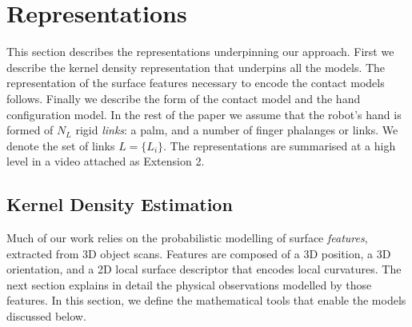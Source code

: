 
\section{Representations}\label{sec:representations}

This section describes the representations underpinning our approach. First we describe the kernel density representation  that underpins all the models. The representation of the surface features necessary to encode the contact models follows. Finally we describe the form of the contact model and the hand configuration model. In the rest of the paper we assume that the robot's hand is formed of $N_L$ rigid \emph{links}: a palm, and a number of finger phalanges or links. We denote the set of links $L =\{L_i\}$. The representations are summarised at a high level in a video attached as Extension 2.




\subsection{Kernel Density Estimation}



\label{sec:kde}

Much of our work relies on the probabilistic modelling of surface \emph{features}, extracted from 3D object scans. Features are composed of a 3D position, a 3D orientation, and a 2D local surface descriptor that encodes local curvatures. The next section explains in detail the physical observations modelled by those features. In this section, we define the mathematical tools that enable the models discussed below.

